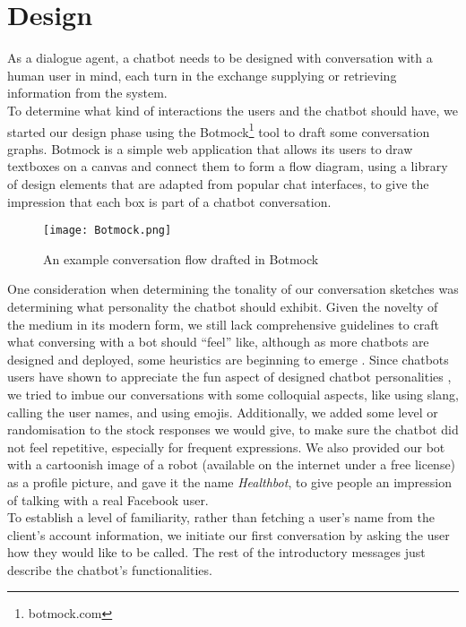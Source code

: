 \section{Design}
As a dialogue agent, a chatbot needs to be designed with conversation with a human user in mind, each turn in the exchange supplying or retrieving information from the system. \\
To determine what kind of interactions the users and the chatbot should have, we started our design phase using the Botmock\footnote{botmock.com} tool to draft some conversation graphs. Botmock is a simple web application that allows its users to draw textboxes on a canvas and connect them to form a flow diagram, using a library of design elements that are adapted from popular chat interfaces, to give the impression that each box is part of a chatbot conversation. \\
\begin{figure}[h!]
  \texttt{[image: Botmock.png]}
  \caption{An example conversation flow drafted in Botmock}
\end{figure}
One consideration when determining the tonality of our conversation sketches was determining what personality the chatbot should exhibit. Given the novelty of the medium in its modern form, we still lack comprehensive guidelines to craft what conversing with a bot should ``feel'' like, although as more chatbots are designed and deployed, some heuristics are beginning to emerge \cite{jessie}. Since chatbots users have shown to appreciate the fun aspect of designed chatbot personalities \cite{10.1007/978-3-319-67744-6_28}, we tried to imbue our conversations with some colloquial aspects, like using slang, calling the user names, and using emojis. Additionally, we added some level or randomisation to the stock responses we would give, to make sure the chatbot did not feel repetitive, especially for frequent expressions. We also provided our bot with a cartoonish image of a robot (available on the internet under a free license) as a profile picture, and gave it the name \textit{Healthbot}, to give people an impression of talking with a real Facebook user. \\
To establish a level of familiarity, rather than fetching a user's name from the client's account information, we initiate our first conversation by asking the user how they would like to be called. The rest of the introductory messages just describe the chatbot's functionalities.
